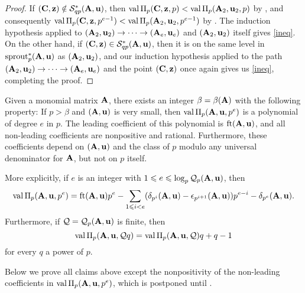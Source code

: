 \documentclass{amsart}
\begin{document}
\begin{proof}
   If $(\mathbf{C},\mathbf{z}) \notin \mathcal{S}^{\ast}_{qp}(\mathbf{A},\mathbf{u})$, then $\operatorname{val} \Pi_p(\mathbf{C},\mathbf{z}, p)< \operatorname{val} \Pi_p(\mathbf{A}_2, \mathbf{u}_2, p)$ by , and consequently $\operatorname{val} \Pi_p(\mathbf{C}, \mathbf{z},p^{e-1}) < \operatorname{val}\Pi_p(\mathbf{A}_2,\mathbf{u}_2, p^{e-1})$ by .
   The induction hypothesis applied to $(\mathbf{A}_2, \mathbf{u}_2) \to \cdots \to (\mathbf{A}_e, \mathbf{u}_e)$ and $(\mathbf{A}_2,\mathbf{u}_2)$ itself gives \eqref{ineq}.
   On the other hand, if $(\mathbf{C}, \mathbf{z}) \in \mathcal{S}^{\ast}_{qp}(\mathbf{A},\mathbf{u})$, then it is on the same level in $\operatorname{sprout}_p^{\ast}(\mathbf{A},\mathbf{u})$ as $(\mathbf{A}_2, \mathbf{u}_2)$, and  our induction hypothesis applied to the path $(\mathbf{A}_2, \mathbf{u}_2) \to \cdots \to (\mathbf{A}_e, \mathbf{u}_e)$ and the point $(\mathbf{C}, \mathbf{z})$ once again gives us \eqref{ineq}, completing the proof.
\end{proof}

\begin{theorem}
   \label{main theorem wrt diagonal: T}
   Given a monomial matrix $\mathbf{A}$, there exists an integer $\beta = \beta(\mathbf{A})$ with the following property\textup:
   If $p > \beta$ and $(\mathbf{A},\mathbf{u})$ is very small, then $\operatorname{val} \Pi_p(\mathbf{A},\mathbf{u},p^e)$ is a polynomial of degree $e$ in $p$.
   The leading coefficient of this polynomial is $\operatorname{ft}(\mathbf{A}, \mathbf{u})$, and all non-leading coefficients are nonpositive and rational.
   Furthermore, these coefficients depend on $(\mathbf{A},\mathbf{u})$ and the class of $p$ modulo any universal denominator for $\mathbf{A}$, but not on $p$ itself.

   More explicitly, if $e$ is an integer with $1 \leqslant e \leqslant \log_p \mathcal{Q}_p(\mathbf{A},\mathbf{u})$, then
   \[
      \operatorname{val} \Pi_p(\mathbf{A},\mathbf{u}, p^e) =  \operatorname{ft}(\mathbf{A}, \mathbf{u})  p^e - \sum_{1 \leqslant i < e} ( \delta_{p^i}(\mathbf{A},\mathbf{u}) - \epsilon_{p^{i+1}}(\mathbf{A},\mathbf{u}))  p^{e-i} - \delta_{p^e}(\mathbf{A},\mathbf{u}).
   \]
   Furthermore, if $\mathcal{Q} = \mathcal{Q}_p(\mathbf{A},\mathbf{u})$ is finite, then
   \[
      \operatorname{val} \Pi_p(\mathbf{A},\mathbf{u}, \mathcal{Q} q) = \operatorname{val} \Pi_p(\mathbf{A},\mathbf{u}, \mathcal{Q})  q + q-1
   \]
   for every $q$ a power of $p$.
\end{theorem}

Below we prove all claims above except the nonpositivity of the non-leading coefficients in $\operatorname{val} \Pi_p(\mathbf{A},\mathbf{u},p^e)$, which is postponed until .
\end{document}

